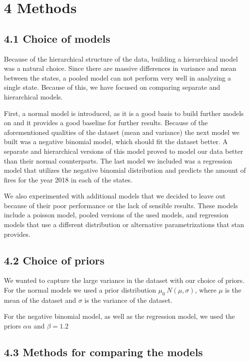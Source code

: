 \documentclass[]{article}
\begin{document}
\section{4 Methods}\label{methods}

\subsection{4.1 Choice of models}\label{choice-of-models}

Because of the hierarchical structure of the data, building a
hierarchical model was a natural choice. Since there are massive
differences in variance and mean between the states, a pooled model can
not perform very well in analyzing a single state. Because of this, we
have focused on comparing separate and hierarchical models.

First, a normal model is introduced, as it is a good basis to build
further models on and it provides a good baseline for further results.
Because of the aforementioned qualities of the dataset (mean and
variance) the next model we built was a negative binomial model, which
should fit the dataset better. A separate and hierarchical versions of
this model proved to model our data better than their normal
counterparts. The last model we included was a regression model that
utilizes the negative binomial distribution and predicts the amount of
fires for the year 2018 in each of the states.

We also experimented with additional models that we decided to leave out
because of their poor performance or the lack of sensible results. These
models include a poisson model, pooled versions of the used models, and
regression models that use a different distribution or alternative
parametrizations that stan provides.

\subsection{4.2 Choice of priors}\label{choice-of-priors}

We wanted to capture the large variance in the dataset with our choice
of priors. For the normal models we used a prior distribution
\(\mu_0 ~ N(\mu, \sigma)\), where \(\mu\) is the mean of the dataset and
\(\sigma\) is the variance of the dataset.

For the negative binomial model, as well as the regression model, we
used the priors \(\alpha u\) and \(\beta = 1.2\)

\subsection{4.3 Methods for comparing the
models}\label{methods-for-comparing-the-models}
\end{document}
